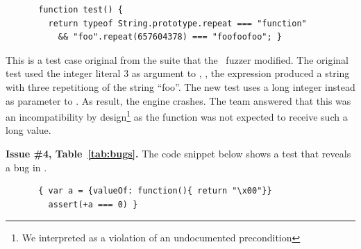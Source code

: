 \documentclass[smallextended]{svjour3}
\begin{document}
\begin{figure}[h!]
  \vspace{-0.5ex}
  \centering
  \scriptsize
  \begin{lstlisting}
 function test() {
   return typeof String.prototype.repeat === "function"
     && "foo".repeat(657604378) === "foofoofoo"; }
  \end{lstlisting}
  \normalsize
  \vspace{-1ex}
\end{figure}


This is a test case original from the \jsc suite that the
\radamsa\ fuzzer modified. The original test used the integer literal
3 as argument to , \ie{}, the expression produced a
string with three repetitiong of the string ``foo''. The new test uses
a long integer instead as parameter to . As result,
the engine crashes. The team answered that this was an incompatibility
by design\footnote{We interpreted as a violation of an undocumented
  precondition} as the function was not expected to receive such a
long value.


\vspace{1ex}\noindent\textbf{Issue \#4, Table~\ref{tab:bugs}.} The
code snippet below shows a test that reveals a bug in \textbf{\chakra}.

\begin{figure}[h!]
  \vspace{-1ex}
  \centering
  \scriptsize
  \begin{lstlisting}
 { var a = {valueOf: function(){ return "\x00"}}
   assert(+a === 0) }
  \end{lstlisting}
  \normalsize
  \vspace{-1ex}
\end{figure}
\end{document}
